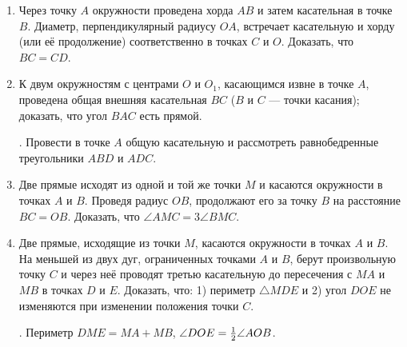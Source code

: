 \documentclass[twoside]{book}
\begin{document}
\begin{enumerate}[resume]
 \item
Через точку $A$ окружности проведена хорда $AB$ и затем касательная в точке $B$.
Диаметр, перпендикулярный радиусу $OA$, встречает касательную и хорду (или её продолжение) соответственно в точках $C$ и $O$.
Доказать, что $BC=CD$.

 \item
К двум окружностям с центрами $O$ и $O_1$, касающимся извне в точке $A$, проведена общая внешняя касательная $BC$ ($B$ и $C$ — точки касания);
доказать, что угол $BAC$ есть прямой.

\smallskip
{}.
Провести в точке $A$ общую касательную и рассмотреть равнобедренные треугольники $ABD$ и $ADC$.

 \item
Две прямые исходят из одной и той же точки $M$ и касаются окружности в точках $A$ и $B$.
Проведя радиус $OB$, продолжают его за точку $B$ на расстояние $BC=OB$.
Доказать, что $\angle AMC=3\angle BMC$.

 \item
Две прямые, исходящие из точки $M$, касаются окружности в точках $A$ и $B$.
На меньшей из двух дуг, ограниченных точками $A$ и $B$, берут произвольную точку $C$ и через неё проводят третью касательную до пересечения с $MA$ и $MB$ в точках $D$ и $E$.
Доказать, что:
1) периметр $\triangle MDE$ и 2) угол $DOE$ не изменяются при изменении положения точки $C$.

\smallskip
{}.
Периметр $DME=MA+MB$, $\angle DOE\z=\tfrac12 \angle AOB$.
\end{enumerate}


\begin{center}
\end{center}
\end{document}
